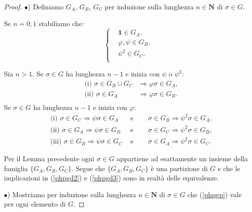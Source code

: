 \documentclass[a4paper,oneside,11pt]{book}
\theoremstyle{definition} \newtheorem{Def}{Definizione}
\theoremstyle{plain} \newtheorem{teo}{Teorema}
\theoremstyle{plain} \newtheorem{cor}[teo]{Corollario}
\theoremstyle{definition} \newtheorem{lem}[teo]{Lemma}
\theoremstyle{plain} \newtheorem{pro}[teo]{Proposizione}
\newcommand{\ug}[1]{(\ref{#1})} %
\begin{document}
	\begin{proof}
		$\bullet$) Definiamo $G_A$, $G_B$, $G_C$ per induzione sulla lunghezza $n \in \mathbf{N}$ di $\sigma \in G$.
		
		Se $n = 0,1$ stabiliamo che:
		\begin{equation}\label{phpgd1} %
			\left\{\begin{aligned}
				&\mathbf{1} \in G_A \text{,}\\
				&\varphi, \psi \in G_B \text{,}\\
				&\psi^2 \in G_C \text{.}\\
			\end{aligned} \right. 
		\end{equation}
		
		Sia $n>1$. Se $\sigma \in G$ ha lunghezza $n-1$ e inizia con $\psi$ o $\psi^2$:
			\begin{equation}\label{phpgd2}
				\begin{aligned}
					&\text{(i) } \sigma \in G_B \cup G_C &\Rightarrow \varphi\sigma \in G_A \text{,}\\
					&\text{(ii) } \sigma \in G_A &\Rightarrow \varphi\sigma \in G_B \text{.}\\
				\end{aligned}
			\end{equation}
		Se $\sigma \in G$ ha lunghezza $n-1$ e inizia con $\varphi$:
			\begin{equation}\label{phpgd3}
				\begin{aligned}
					&\text{(i) } \sigma \in G_C \Rightarrow \psi\sigma \in G_A &\text{ e }\quad &\sigma \in G_B \Rightarrow \psi^2\sigma \in G_A \text{,}\\
					&\text{(ii) } \sigma \in G_A \Rightarrow \psi\sigma \in G_B &\text{ e }\quad &\sigma \in G_C \Rightarrow \psi^2\sigma \in G_B \text{,}\\
					&\text{(iii) } \sigma \in G_B \Rightarrow \psi\sigma \in G_C &\text{ e }\quad &\sigma \in G_A \Rightarrow \psi^2\sigma \in G_C \text{.}		
				\end{aligned}
			\end{equation}
			
		Per il Lemma precedente ogni $\sigma \in G$ appartiene ad esattamente un insieme della famiglia $\{G_A, G_B, G_C\}$. Segue che $\{G_A, G_B, G_C\}$ è una partizione di $G$ e che le implicazioni in \ug{phpgd2} e \ug{phpgd3} sono in realtà delle equivalenze.
		
		$\bullet$) Mostriamo per induzione sulla lunghezza $n \in \mathbf{N}$ di $\sigma \in G$ che \ug{phpgp} vale per ogni elemento di $G$.
		

\end{proof}
\end{document}
